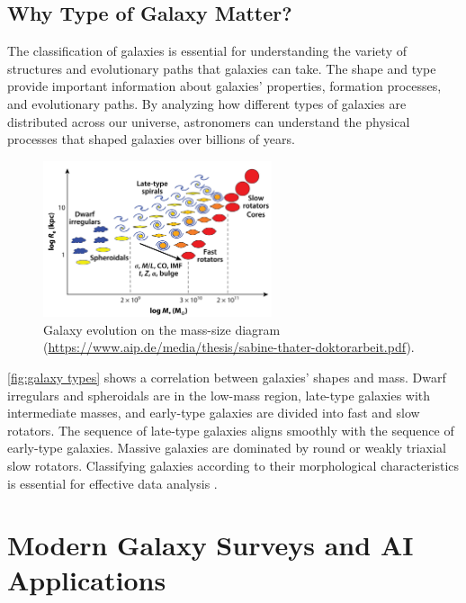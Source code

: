 \subsection*{Why Type of Galaxy Matter?}

The classification of galaxies is essential for understanding the variety of structures and evolutionary paths that galaxies can take. The shape and type provide important information about galaxies' properties, formation processes, and evolutionary paths. By analyzing how different types of galaxies are distributed across our universe, astronomers can understand the physical processes that shaped galaxies over billions of years. 

\begin{figure}[htbp]
    \centering
    \includegraphics[width=0.6\textwidth]{obrazky-figures/02-theoretical-basis/types.png}
    \caption{Galaxy evolution on the mass-size diagram (\url{https://www.aip.de/media/thesis/sabine-thater-doktorarbeit.pdf}).}
    \label{fig:galaxy types}
\end{figure}

\autoref{fig:galaxy types} shows a correlation between galaxies' shapes and mass. Dwarf irregulars and spheroidals are in the low-mass region, late-type galaxies with intermediate masses, and early-type galaxies are divided into fast and slow rotators. The sequence of late-type galaxies aligns smoothly with the sequence of early-type galaxies. Massive galaxies are dominated by round or weakly triaxial slow rotators. Classifying galaxies according to their morphological characteristics is essential for effective data analysis \cite{cao2024galaxy}.

\section{Modern Galaxy Surveys and AI Applications}
\label{sec:modern-app}

